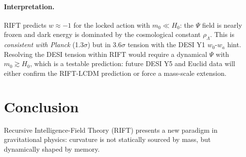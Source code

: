 \documentclass[12pt,a4paper]{article}
\begin{document}
\paragraph{Interpretation.}
RIFT predicts $w\approx-1$ for the locked action with $m_0\ll H_0$:
the $\Psi$ field is nearly frozen and dark energy is dominated by the
cosmological constant $\rho_\Lambda$.  This is \emph{consistent with
Planck} (1.3$\sigma$) but in 3.6$\sigma$ tension with the DESI Y1
$w_0$-$w_a$ hint.  Resolving the DESI tension within RIFT would require
a dynamical $\Psi$ with $m_0\gtrsim H_0$, which is a testable
prediction: future DESI Y5 and Euclid data will either confirm the
RIFT-LCDM prediction or force a mass-scale extension.

\section{Conclusion}
\label{sec:conclusion}

Recursive Intelligence-Field Theory (RIFT) presents a new paradigm in gravitational
physics: curvature is not statically sourced by mass, but dynamically shaped by memory.
\end{document}
